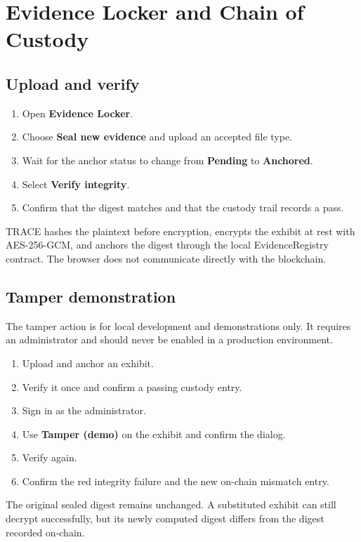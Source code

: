 \documentclass[11pt,a4paper]{article}
\begin{document}
\section{Evidence Locker and Chain of Custody}

\subsection{Upload and verify}

\begin{enumerate}[leftmargin=*]
  \item Open \textbf{Evidence Locker}.
  \item Choose \textbf{Seal new evidence} and upload an accepted file type.
  \item Wait for the anchor status to change from \textbf{Pending} to \textbf{Anchored}.
  \item Select \textbf{Verify integrity}.
  \item Confirm that the digest matches and that the custody trail records a pass.
\end{enumerate}

TRACE hashes the plaintext before encryption, encrypts the exhibit at rest with AES-256-GCM, and anchors the digest through the local EvidenceRegistry contract. The browser does not communicate directly with the blockchain.

\subsection{Tamper demonstration}

The tamper action is for local development and demonstrations only. It requires an administrator and should never be enabled in a production environment.

\begin{enumerate}[leftmargin=*]
  \item Upload and anchor an exhibit.
  \item Verify it once and confirm a passing custody entry.
  \item Sign in as the administrator.
  \item Use \textbf{Tamper (demo)} on the exhibit and confirm the dialog.
  \item Verify again.
  \item Confirm the red integrity failure and the new on-chain mismatch entry.
\end{enumerate}

The original sealed digest remains unchanged. A substituted exhibit can still decrypt successfully, but its newly computed digest differs from the digest recorded on-chain.
\end{document}

